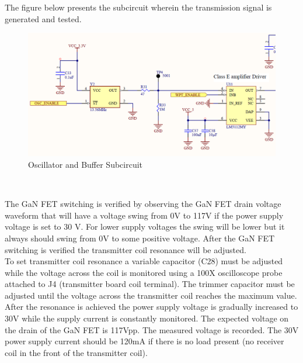 \documentclass[12pt]{article}
\begin{document}
\noindent
The figure below presents the subcircuit wherein the transmission signal is generated and tested.
\hfill
\begin{figure}[h!]
\centering
\includegraphics[width=0.9\linewidth]{TX_oscillator_and_buffer}
\caption{Oscillator and Buffer Subcircuit}
\end{figure}
\hfill \\
\pagebreak

\indent
The GaN FET switching is verified by observing the GaN FET drain voltage waveform that will have a voltage swing from 0V to 117V if the power supply voltage is set to 30 V. For lower supply voltages the swing will be lower but it always should swing from 0V to some positive voltage.  After the GaN FET switching is verified the transmitter coil resonance will be adjusted. \\

\indent
To set transmitter coil resonance a variable capacitor (C28) must be adjusted while the voltage across the coil is monitored using a 100X oscilloscope probe attached to J4  (transmitter board coil terminal). The trimmer capacitor must be adjusted until the voltage across the transmitter coil reaches the maximum value. After the resonance is achieved the power supply voltage is gradually increased to 30V while the supply current is constantly monitored.  The expected voltage on the drain of the GaN FET is 117Vpp. The measured voltage is recorded.  The 30V power supply current should be 120mA if there is no load present (no receiver coil in the front of the transmitter coil).\\
\end{document}
